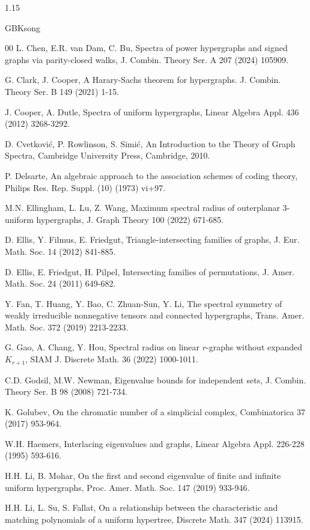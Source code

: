 \documentclass[preprint,12pt]{elsarticle}
\begin{document}
\begin{spacing}{1.15}
\begin{CJK*}{GBK}{song}
\begin{thebibliography}{00}
L. Chen, E.R. van Dam, C. Bu, Spectra of power hypergraphs and signed graphs via parity-closed walks, J. Combin. Theory Ser. A 207 (2024) 105909.

G. Clark, J. Cooper, A Harary-Sachs theorem for hypergraphs. J. Combin. Theory Ser. B 149 (2021) 1-15.

J. Cooper, A. Dutle, Spectra of uniform hypergraphs, Linear Algebra Appl. 436 (2012) 3268-3292.

D. Cvetkovi\'{c}, P. Rowlinson, S. Simi\'{c}, An Introduction to the Theory of Graph Spectra, Cambridge University Press, Cambridge, 2010.

P. Delsarte, An algebraic approach to the association schemes of coding theory, Philips Res. Rep. Suppl. (10) (1973) vi+97.

M.N. Ellingham, L. Lu, Z. Wang, Maximum spectral radius of outerplanar $3$-uniform hypergraphs, J. Graph Theory 100 (2022) 671-685.

D. Ellis, Y. Filmus, E. Friedgut, Triangle-intersecting families of graphs, J. Eur. Math. Soc. 14 (2012) 841-885.

D. Ellis, E. Friedgut, H. Pilpel, Intersecting families of permutations, J. Amer. Math. Soc. 24 (2011) 649-682.

Y. Fan, T. Huang, Y. Bao, C. Zhuan-Sun, Y. Li, The spectral symmetry of weakly irreducible nonnegative tensors and connected hypergraphs, Trans. Amer. Math. Soc. 372 (2019) 2213-2233.

G. Gao, A. Chang, Y. Hou, Spectral radius on linear $r$-graphs without expanded $K_{r+1}$, SIAM J. Discrete Math. 36 (2022) 1000-1011.

C.D. Godsil, M.W. Newman, Eigenvalue bounds for independent sets, J. Combin. Theory Ser. B 98 (2008) 721-734.

K. Golubev, On the chromatic number of a simplicial complex, Combinatorica 37 (2017) 953-964.

W.H. Haemers, Interlacing eigenvalues and graphs, Linear Algebra Appl. 226-228 (1995) 593-616.

H.H. Li, B. Mohar, On the first and second eigenvalue of finite and infinite uniform hypergraphs, Proc. Amer. Math. Soc. 147 (2019) 933-946.

H.H. Li, L. Su, S. Fallat, On a relationship between the characteristic and matching polynomials of a uniform hypertree, Discrete Math. 347 (2024) 113915.


\end{thebibliography}
\end{CJK*}
\end{spacing}
\end{document}
